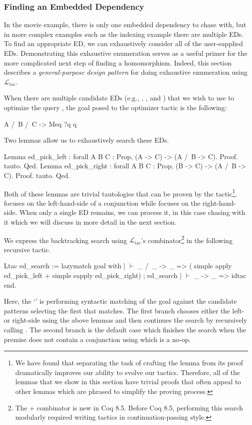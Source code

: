 \documentclass[preprint]{sigplanconf}
\newcommand{\ltac}[0]{\ensuremath{\mathcal{L}_{\mathrm{tac}}}}
\begin{document}

\subsubsection{Finding an Embedded Dependency}
\label{sec:traverse-ed}

In the movie example, there is only one embedded dependency to chase with, but in more complex examples such as the indexing example there are multiple EDs.
To find an appropriate ED, we can exhaustively consider all of the user-supplied EDs.
Demonstrating this exhaustive enumeration serves as a useful primer for the more complicated next step of finding a homomorphism.
Indeed, this section describes a \emph{general-purpose design pattern} for doing exhaustive enumeration using \ltac{}.

When there are multiple candidate EDs (e.g., , , and ) that we wish to use to optimize the query , the goal posed to the optimizer tactic is the following:
\begin{coq}
A /\ B /\ C -> Meq ?q q
\end{coq}

Two lemmas allow us to exhaustively search these EDs.
\begin{coq}
Lemma ed_pick_left : forall {A B C : Prop},
  (A -> C) -> (A /\ B -> C).
Proof. tauto. Qed.
Lemma ed_pick_right : forall {A B C : Prop},
  (B -> C) -> (A /\ B -> C).
Proof. tauto. Qed.
\end{coq}
Both of these lemmas are trivial tautologies that can be proven by the  tactic\footnote{We have found that separating the task of crafting the lemma from its proof dramatically improves our ability to evolve our tactics.
Therefore, all of the lemmas that we show in this section have trivial proofs that often appeal to other lemmas which are phrased to simplify the proving process.}.
 focuses on the left-hand-side of a conjunction while  focuses on the right-hand-side.
When only a single ED remains, we can process it, in this case chasing with it which we will discuss in more detail in the next section.

We express the backtracking search using \ltac's \coqe{+} combinator\footnote{The + combinator is new in Coq 8.5. Before Coq 8.5, performing this search modularly required writing tactics in continuation-passing style.} in the following recursive tactic.
\begin{coq}
Ltac ed_search :=
  lazymatch goal with
  | $\vdash$ _ /\ _ -> _ =>
    (  simple apply ed_pick_left
     + simple eapply ed_pick_right) ; ed_search
  | $\vdash$ _ -> _ => idtac
  end.
\end{coq}
Here, the `' is performing syntactic matching of the goal against the candidate patterns selecting the first that matches.
The first branch chooses either the left- or right-side using the above lemmas and then continues the search by recursively calling .
The second branch is the default case which finishes the search when the premise does not contain a conjunction using  which is a no-op.
\end{document}
